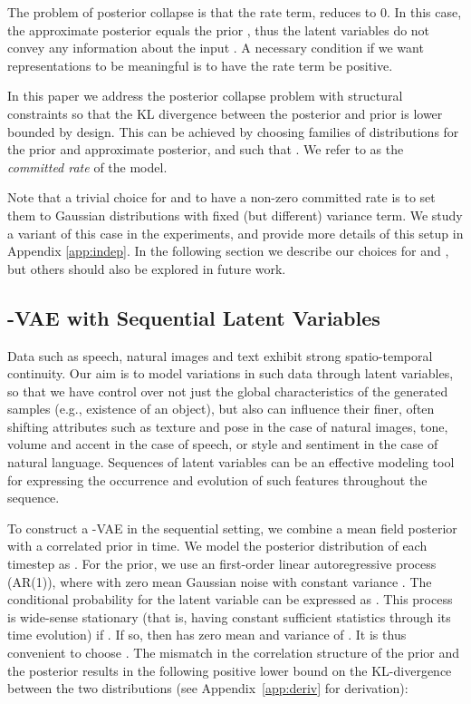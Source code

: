 \documentclass{article} \usepackage{iclr2019_conference,times}
\newcommand{\aref}[1]{Appendix~\ref{#1}}
\begin{document}
The problem of posterior collapse is that the rate term,  reduces to 0. In this case, the approximate posterior  equals the prior , thus the latent variables do not convey any information about the input . A necessary condition if we want representations to be meaningful is to have the rate term be positive.


In this paper we address the posterior collapse problem with structural constraints so that the KL divergence between the  posterior and prior is lower bounded by design.
This can be achieved by choosing families of distributions for the prior and approximate posterior,  and  such that . We refer to  as the \emph{committed rate} of the model. 

Note that a trivial choice for  and  to have a non-zero committed rate is to set them to Gaussian distributions with fixed (but different) variance term. We study a variant of this case in the experiments, and provide more details of this setup in Appendix \ref{app:indep}. In the following section we describe our choices for  and  , but others should also be explored in future work.


\subsection{-VAE with Sequential Latent Variables}

Data such as speech, natural images and text exhibit strong spatio-temporal continuity. Our aim is to model variations in such data through latent variables, so that we have control over not just the global
characteristics of the generated samples (e.g., existence of an object), but also can influence their finer, often shifting attributes such as texture and pose in the case of natural images, tone, volume and accent in the case of speech, or style and sentiment in the case of natural language. Sequences of latent variables can be an effective modeling tool for expressing the occurrence and evolution of such features throughout the sequence. 

\par
To construct a -VAE in the sequential setting, we combine a mean field posterior with a correlated prior in time. We model the posterior distribution of each timestep as . For the prior, we use an first-order linear autoregressive process (AR(1)), where  with  zero mean Gaussian noise with constant variance . The conditional probability for the latent variable can be expressed as . This process is wide-sense stationary (that is, having constant sufficient statistics through its time evolution) if . If so, then  has zero mean and variance of . It is thus convenient to choose .  The mismatch in the correlation structure of the prior and the posterior results in the following positive lower bound on the KL-divergence between the two distributions (see \aref{app:deriv} for derivation):
\end{document}

